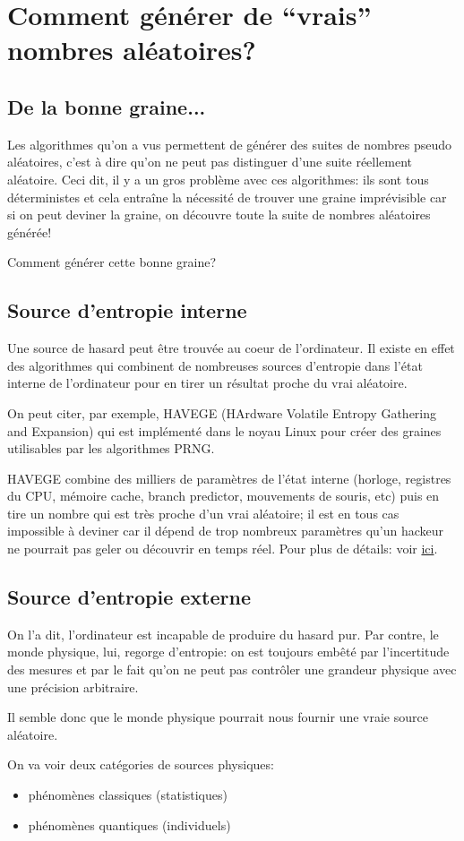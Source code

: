 \documentclass{scrartcl}
\begin{document}
\section{Comment générer de ``vrais'' nombres aléatoires?}\label{s:TRNG}
\subsection{De la bonne graine...}
Les algorithmes qu'on a vus permettent de générer des suites de nombres pseudo aléatoires, c'est à dire qu'on ne peut pas distinguer d'une suite réellement aléatoire. Ceci dit, il y a un gros problème avec ces algorithmes: ils sont tous déterministes et cela entraîne la nécessité de trouver une graine imprévisible car si on peut deviner la graine, on découvre toute la suite de nombres aléatoires générée!\par
Comment générer cette bonne graine?

\subsection{Source d'entropie interne}
Une source de hasard peut être trouvée au coeur de l'ordinateur. Il existe en effet des algorithmes qui combinent de nombreuses sources d'entropie dans l’état interne de l’ordinateur pour en tirer un résultat proche du vrai aléatoire. \par
On peut citer, par exemple, HAVEGE (HArdware Volatile Entropy Gathering and Expansion) qui est implémenté dans le noyau Linux pour créer des graines utilisables par les algorithmes PRNG.\par
HAVEGE combine des milliers de paramètres de l’état interne (horloge, registres du CPU, mémoire cache, branch predictor, mouvements de souris, etc) puis en tire un nombre qui est très proche d'un vrai aléatoire; il est en tous cas impossible à deviner car il dépend de trop nombreux paramètres qu’un hackeur ne pourrait pas geler ou découvrir en temps réel.
Pour plus de détails: voir \href{https://www.irisa.fr/caps/projects/hipsor/misc.php}{ici}.

\subsection{Source d'entropie externe}
On l'a dit, l'ordinateur est incapable de produire du hasard pur. Par contre, le monde physique, lui, regorge d'entropie: on est toujours embêté par l’incertitude des mesures et par le fait qu’on ne peut pas contrôler une grandeur physique avec une précision arbitraire. \par
Il semble donc que le monde physique pourrait nous fournir une vraie source aléatoire. \par
On va voir deux catégories de sources physiques:
\begin{itemize}
\item phénomènes classiques (statistiques)
\item phénomènes quantiques (individuels)
\end{itemize}
\end{document}
